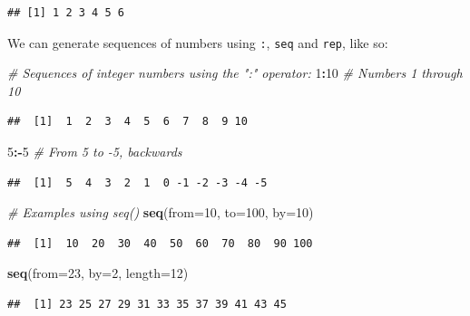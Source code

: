 \documentclass[]{book}
\newenvironment{Shaded}{\begin{snugshade}}{\end{snugshade}}
\newcommand{\CommentTok}[1]{\textcolor[rgb]{0.56,0.35,0.01}{\textit{#1}}}
\newcommand{\DataTypeTok}[1]{\textcolor[rgb]{0.13,0.29,0.53}{#1}}
\newcommand{\DecValTok}[1]{\textcolor[rgb]{0.00,0.00,0.81}{#1}}
\newcommand{\KeywordTok}[1]{\textcolor[rgb]{0.13,0.29,0.53}{\textbf{#1}}}
\newcommand{\NormalTok}[1]{#1}
\newcommand{\OperatorTok}[1]{\textcolor[rgb]{0.81,0.36,0.00}{\textbf{#1}}}
\begin{document}
\begin{verbatim}
## [1] 1 2 3 4 5 6
\end{verbatim}

We can generate sequences of numbers using \texttt{:}, \texttt{seq} and \texttt{rep}, like so:

\begin{Shaded}
\begin{Highlighting}[]
\CommentTok{# Sequences of integer numbers using the ":" operator:}
\DecValTok{1}\OperatorTok{:}\DecValTok{10}   \CommentTok{# Numbers 1 through 10}
\end{Highlighting}
\end{Shaded}

\begin{verbatim}
##  [1]  1  2  3  4  5  6  7  8  9 10
\end{verbatim}

\begin{Shaded}
\begin{Highlighting}[]
\DecValTok{5}\OperatorTok{:-}\DecValTok{5}   \CommentTok{# From 5 to -5, backwards}
\end{Highlighting}
\end{Shaded}

\begin{verbatim}
##  [1]  5  4  3  2  1  0 -1 -2 -3 -4 -5
\end{verbatim}

\begin{Shaded}
\begin{Highlighting}[]
\CommentTok{# Examples using seq()}
\KeywordTok{seq}\NormalTok{(}\DataTypeTok{from=}\DecValTok{10}\NormalTok{, }\DataTypeTok{to=}\DecValTok{100}\NormalTok{, }\DataTypeTok{by=}\DecValTok{10}\NormalTok{)}
\end{Highlighting}
\end{Shaded}

\begin{verbatim}
##  [1]  10  20  30  40  50  60  70  80  90 100
\end{verbatim}

\begin{Shaded}
\begin{Highlighting}[]
\KeywordTok{seq}\NormalTok{(}\DataTypeTok{from=}\DecValTok{23}\NormalTok{, }\DataTypeTok{by=}\DecValTok{2}\NormalTok{, }\DataTypeTok{length=}\DecValTok{12}\NormalTok{)}
\end{Highlighting}
\end{Shaded}

\begin{verbatim}
##  [1] 23 25 27 29 31 33 35 37 39 41 43 45
\end{verbatim}
\end{document}
